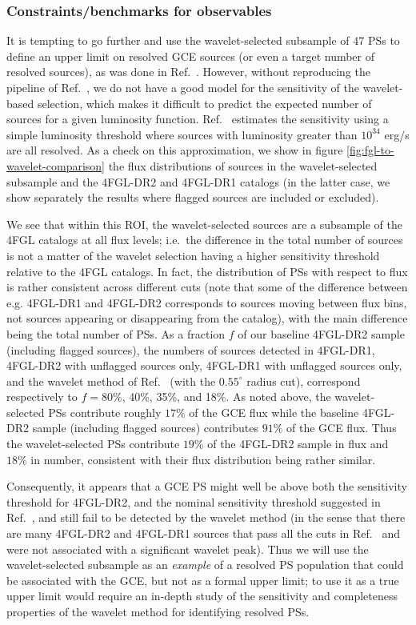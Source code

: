 \documentclass[letter,11pt]{article}
\begin{document}
\subsubsection{Constraints/benchmarks for observables}

It is tempting to go further and use the wavelet-selected subsample of 47 PSs to define an upper limit on resolved GCE sources (or even a target number of resolved sources), as was done in Ref.~\cite{Zhong:2019ycb}. However, without reproducing the pipeline of Ref.~\cite{Zhong:2019ycb}, we do not have a good model for the sensitivity of the wavelet-based selection, which makes it difficult to predict the expected number of sources for a given luminosity function. Ref.~\cite{Zhong:2019ycb} estimates the sensitivity using a simple luminosity threshold where sources with luminosity greater than $10^{34}$ erg/s are all resolved. As a check on this approximation, we show in figure \ref{fig:fgl-to-wavelet-comparison} the flux distributions of sources in the wavelet-selected subsample and the 4FGL-DR2 and 4FGL-DR1 catalogs (in the latter case, we show separately the results where flagged sources are included or excluded).

We see that within this ROI, the wavelet-selected sources are a subsample of the 4FGL catalogs at all flux levels; i.e.~the difference in the total number of sources is not a matter of the wavelet selection having a higher sensitivity threshold relative to the 4FGL catalogs. In fact, the distribution of PSs with respect to flux is rather consistent across different cuts (note that some of the difference between e.g. 4FGL-DR1 and 4FGL-DR2 corresponds to sources moving between flux bins, not sources appearing or disappearing from the catalog), with the main difference being the total number of PSs. As a fraction $f$ of our baseline 4FGL-DR2 sample (including flagged sources), the numbers of sources detected in 4FGL-DR1, 4FGL-DR2 with unflagged sources only, 4FGL-DR1 with unflagged sources only, and the wavelet method of Ref.~\cite{Zhong:2019ycb} (with the $0.55^\circ$ radius cut), correspond respectively to $f=80\%$, 40\%, 35\%, and 18\%. As noted above, the wavelet-selected PSs contribute roughly $17\%$ of the GCE flux while the baseline 4FGL-DR2 sample (including flagged sources) contributes $91\%$ of the GCE flux. Thus the wavelet-selected PSs contribute $19\%$ of the 4FGL-DR2 sample in flux and $18\%$ in number, consistent with their flux distribution being rather similar.

Consequently, it appears that a GCE PS might well be above both the sensitivity threshold for 4FGL-DR2, and the nominal sensitivity threshold suggested in Ref.~\cite{Zhong:2019ycb}, and still fail to be detected by the wavelet method (in the sense that there are many 4FGL-DR2 and 4FGL-DR1 sources that pass all the cuts in Ref.~\cite{Zhong:2019ycb} and were not associated with a significant wavelet peak). Thus we will use the wavelet-selected subsample as an {\it example} of a resolved PS population that could be associated with the GCE, but not as a formal upper limit; to use it as a true upper limit would require an in-depth study of the sensitivity and completeness properties of the wavelet method for identifying resolved PSs.
\end{document}
